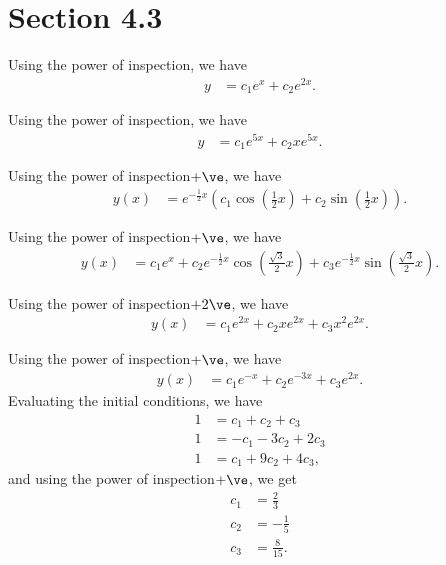 \documentclass[10pt]{mypackage}
\begin{document}
\section{Section 4.3}%
\begin{solution}[Problem 4]
  Using the power of inspection, we have
  \begin{align*}
    y &= c_1e^{x} + c_2e^{2x}.
  \end{align*}
\end{solution}
\begin{solution}[Problem 6]
  Using the power of inspection, we have
  \begin{align*}
    y &= c_1e^{5x} + c_2xe^{5x}.
  \end{align*}
\end{solution}
\begin{solution}[Problem 12]
  Using the power of inspection$+ \ve$, we have
  \begin{align*}
    y(x) &= e^{-\frac{1}{2}x} \left(c_1\cos\left(\frac{1}{2}x\right) + c_2\sin\left(\frac{1}{2}x\right)\right).
  \end{align*}
\end{solution}
\begin{solution}[Problem 16]
  Using the power of inspection$+\ve$, we have
  \begin{align*}
    y(x) &= c_1e^{x} + c_2e^{-\frac{1}{2}x}\cos\left(\frac{\sqrt{3}}{2}x\right) + c_3e^{-\frac{1}{2}x}\sin\left(\frac{\sqrt{3}}{2}x\right).
  \end{align*}
\end{solution}
\begin{solution}[Problem 22]
  Using the power of inspection$+2\ve$, we have
  \begin{align*}
    y(x) &= c_1e^{2x} + c_2xe^{2x} + c_3x^2e^{2x}.
  \end{align*}
\end{solution}
\begin{solution}[Problem 36]
  Using the power of inspection$+\ve$, we have
  \begin{align*}
    y(x) &= c_1e^{-x} + c_2e^{-3x} + c_3e^{2x}.
  \end{align*}
  Evaluating the initial conditions, we have
  \begin{align*}
    1 &= c_1 + c_2 + c_3\\
    1 &= -c_1 - 3c_2 + 2c_3\\
    1 &= c_1 + 9c_2 + 4c_3,
  \end{align*}
  and using the power of inspection$+\ve$, we get
  \begin{align*}
    c_1 &= \frac{2}{3}\\
    c_2 &= -\frac{1}{5}\\
    c_3 &= \frac{8}{15}.
  \end{align*}
  
\end{solution}
\begin{solution}[Problem 38]

\end{solution}
\begin{solution}[Problem 50]

\end{solution}
\end{document}
